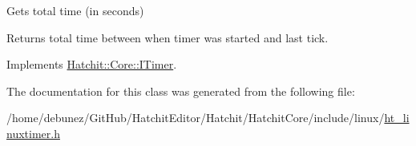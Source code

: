 Gets total time (in seconds) 

Returns total time between when timer was started and last tick. 

Implements \hyperlink{classHatchit_1_1Core_1_1ITimer_af5d9551ef9a0a98591f823b014efca11}{Hatchit\+::\+Core\+::\+I\+Timer}.



The documentation for this class was generated from the following file\+:\begin{DoxyCompactItemize}
\item 
/home/debunez/\+Git\+Hub/\+Hatchit\+Editor/\+Hatchit/\+Hatchit\+Core/include/linux/\hyperlink{ht__linuxtimer_8h}{ht\+\_\+linuxtimer.\+h}\end{DoxyCompactItemize}
